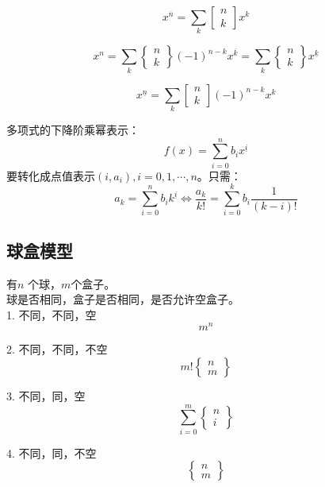 \begin{proposition}
  $$
  x^{\overline{n}} =\sum_{k} \begin{bmatrix} n \\ k \end{bmatrix} x^k
  $$
\end{proposition}

\begin{proposition}
    $$
  x^{n} =\sum_{k} \begin{Bmatrix} n \\ k \end{Bmatrix} (-1)^{n-k} x^{\overline{k}}
  =\sum_{k}  \begin{Bmatrix} n \\ k \end{Bmatrix} x^{\underline{k}}
  $$
\end{proposition}

\begin{proposition}
  $$
  x^{\underline{n}}=\sum_{k} \begin{bmatrix} n \\ k \end{bmatrix} (-1)^{n-k}  x^k
  $$
\end{proposition}


\begin{proposition}
  多项式的下降阶乘幂表示：
  $$
  f(x)=\sum_{i=0}^{n} b_i x^{\underline{i}}
  $$
  要转化成点值表示$(i,a_i),i=0,1,\cdots ,n$。只需：
  $$
  a_k =\sum_{i=0}^{n} b_i k^{\underline{i}} \iff \frac{a_k}{k!}=\sum_{i=0}^{k} b_i \frac{1}{(k-i)!}
  $$
\end{proposition}

\subsection{球盒模型}
有$n$ 个球，$m$个盒子。\\
球是否相同，盒子是否相同，是否允许空盒子。\\
1. 不同，不同，空
$$
m^n
$$

2. 不同，不同，不空
$$
m! \begin{Bmatrix}n \\ m\end{Bmatrix}
$$

3. 不同，同，空
$$
\sum_{i=0}^{m} \begin{Bmatrix}n \\ i\end{Bmatrix}
$$

4. 不同，同，不空
$$
\begin{Bmatrix}n \\ m\end{Bmatrix}
$$

